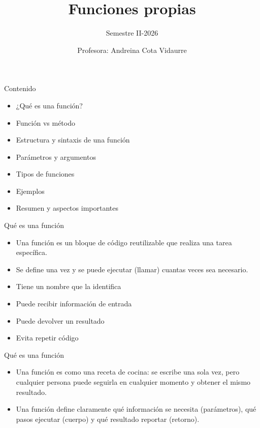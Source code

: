 \documentclass{beamer}
\title{Funciones propias} %
\subtitle{Semestre II-2026} %
\author{Profesora: Andreina Cota Vidaurre}
\begin{document}
  \shorthandoff{-}
  \frame[c]{\maketitle}


    \begin{frame}[fragile, t]{Contenido}
        \begin{itemize}
            \item ¿Qué es una función?
            \item Función vs método
            \item Estructura y sintaxis de una función
            \item Parámetros y argumentos
            \item Tipos de funciones
            \item Ejemplos
            \item Resumen y aspectos importantes
        \end{itemize}
    \end{frame}

    \begin{frame}[fragile, t]{Qué es una función}
        \begin{itemize}
            \item Una función es un bloque de código reutilizable que realiza una tarea específica. 
            \item Se define una vez y se puede ejecutar (llamar) cuantas veces sea necesario.
            \item Tiene un nombre que la identifica
            \item Puede recibir información de entrada
            \item Puede devolver un resultado
            \item Evita repetir código
        \end{itemize}
    \end{frame}

    \begin{frame}{Qué es una función}
        \begin{itemize}
            \item Una función es como una receta de cocina: se escribe una sola vez, pero cualquier persona puede seguirla en cualquier momento y obtener el mismo resultado.
            \item Una función define claramente qué información se necesita (parámetros), qué pasos ejecutar (cuerpo) y qué resultado reportar (retorno).
        \end{itemize}
    \end{frame}
\end{document}
